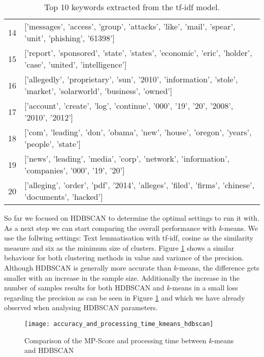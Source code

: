 \begin{table}[h]
{\begin{tabular}{rl}
            14 & ['messages', 'access', 'group', 'attacks', 'like', 'mail', 'spear', 'unit', 'phishing', '61398']                        \\
            15 & ['report', 'sponsored', 'state', 'states', 'economic', 'eric', 'holder', 'case', 'united', 'intelligence']              \\
            16 & ['allegedly', 'proprietary', 'sun', '2010', 'information', 'stole', 'market', 'solarworld', 'business', 'owned']        \\
            17 & ['account', 'create', 'log', 'continue', '000', '19', '20', '2008', '2010', '2012']                                     \\
            18 & ['com', 'leading', 'don', 'obama', 'new', 'house', 'oregon', 'years', 'people', 'state']                                \\
            19 & ['news', 'leading', 'media', 'corp', 'network', 'information', 'companies', '000', '19', '20']                          \\
            20 & ['alleging', 'order', 'pdf', '2014', 'alleges', 'filed', 'firms', 'chinese', 'documents', 'hacked']                     \\
        \hline
        \end{tabular}
        }
        \caption{Top 10 keywords extracted from the tf-idf model.}
        \label{tab:clustering_example_features}
\end{table}

So far we focused on HDBSCAN to determine the optimal settings to run it with. As a next step we can start comparing the overall performance with \textit{k}-means. We use the follwing settings: Text lemmatisation with tf-idf, cosine as the similarity measure and six as the minimum size of clusters. Figure \ref{fig:precision_and_processing_time_kmeans_hdbscan} shows a similar behaviour for both clustering methods in value and variance of the precision. Although HDBSCAN is generally more accurate than \textit{k}-means, the difference gets smaller with an increase in the sample size. Additionally the increase in the number of samples results for both HDBSCAN and \textit{k}-means in a small loss regarding the precision as can be seen in Figure \ref{fig:precision_and_processing_time_kmeans_hdbscan} and which we have already observed when analysing HDBSCAN parameters.

\begin{figure}[h]
    \centering
    \texttt{[image: accuracy\_and\_processing\_time\_kmeans\_hdbscan]}
    \caption{Comparison of the MP-Score and processing time between \textit{k}-means and HDBSCAN}
    \label{fig:precision_and_processing_time_kmeans_hdbscan}
\end{figure}

